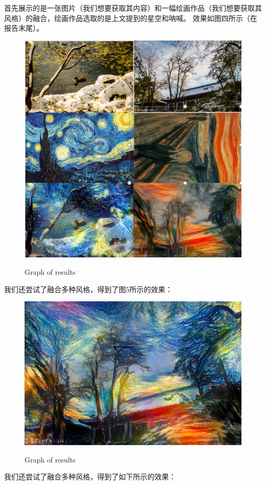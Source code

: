 \documentclass[10pt,a4paper]{ctexart}
\begin{document}
    首先展示的是一张图片（我们想要获取其内容）和一幅绘画作品（我们想要获取其风格）的融合，绘画作品选取的是上文提到的星空和呐喊。
    效果如图四所示（在报告末尾）。
	\begin{figure}[h]
		\centering
		{\includegraphics[width=1\linewidth]{onestyle.png}}
		\caption{Graph of results}
	\end{figure}
    我们还尝试了融合多种风格，得到了图5所示的效果：
	\begin{figure}[h]
		\centering
		{\includegraphics[width=1\linewidth]{style.png}}
		\caption{Graph of results}
	\end{figure}


    我们还尝试了融合多种风格，得到了如下所示的效果：
    
	
\end{document}
